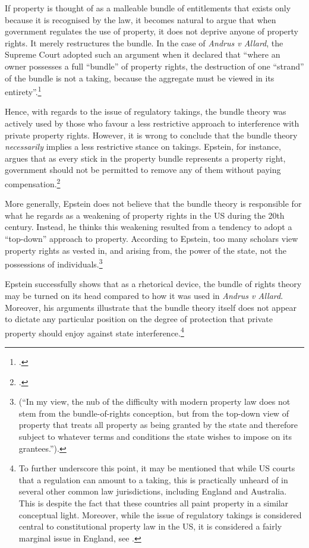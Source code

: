 If property is thought of as a malleable bundle of entitlements that exists only because it is recognised by the law, it becomes natural to argue that when government regulates the use of property, it does not deprive anyone of property rights. It merely restructures the bundle. In the case of {\it Andrus v Allard}, the Supreme Court adopted such an argument when it declared that ``where an owner possesses a full ``bundle'' of property rights, the destruction of one ``strand'' of the bundle is not a taking, because the aggregate must be viewed in its entirety''.\footcite[65--66]{andrus79}

Hence, with regards to the issue of regulatory takings, the bundle theory was actively used by those who favour a less restrictive approach to interference with private property rights. However, it is wrong to conclude that the bundle theory {\it necessarily} implies a less restrictive stance on takings. Epstein, for instance, argues that as every stick in the property bundle represents a property right, government should not be permitted to remove any of them without paying compensation.\footcite[232-233]{epstein11} 

More generally, Epstein does not believe that the bundle theory is responsible for what he regards as a weakening of property rights in the US during the 20th century. Instead, he thinks this weakening resulted from a tendency to adopt a ``top-down'' approach to property. According to Epstein, too many scholars view property rights as vested in, and arising from, the power of the state, not the possessions of individuals.\footnote{\cite[227-228]{epstein11} (``In my view, the nub of the difficulty with modern property law does not stem from the bundle-of-rights conception, but from the top-down view of property that treats all property as being granted by the state and therefore subject to whatever terms and conditions the state wishes to impose on its grantees.'').}

Epstein successfully shows that as a rhetorical device, the bundle of rights theory may be turned on its head compared to how it was used in {\it Andrus v Allard}. Moreover, his arguments illustrate that the bundle theory itself does not appear to dictate any particular position on the degree of protection that private property should enjoy against state interference.\footnote{To further underscore this point, it may be mentioned that while US courts  that a regulation can amount to a taking, this is practically unheard of in several other common law jurisdictions, including England and Australia. This is despite the fact that these countries all paint property in a similar conceptual light. Moreover, while the issue of regulatory takings is considered central to constitutional property law in the US, it is considered a fairly marginal issue in England, see \cite{purdue10}.}

